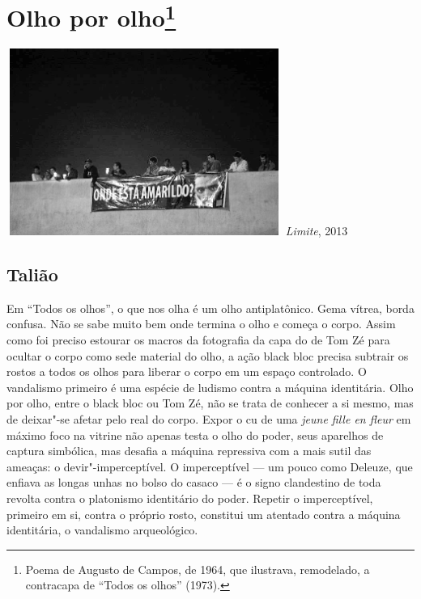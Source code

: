 \section*{Olho por olho\protect\footnote{Poema de Augusto de
  Campos, de 1964, que ilustrava, remodelado, a contracapa de ``Todos os
  olhos'' (1973).}}

\begin{center}
\includegraphics[width=9cm,height=6.1cm]{Imgs/img7.jpg}
\emph{Limite}, 2013
\end{center}

\subsection{Talião}

Em ``Todos os olhos'', o que nos olha é um olho
antiplatônico. Gema vítrea, borda confusa. Não se sabe muito bem onde
termina o olho e começa o corpo. Assim como foi preciso estourar os
macros da fotografia da capa do  de Tom Zé para ocultar o corpo como
sede material do olho, a ação black bloc precisa subtrair os rostos a
todos os olhos para liberar o corpo em um espaço controlado. O
vandalismo primeiro é uma espécie de ludismo contra a máquina
identitária. Olho por olho, entre o black bloc ou Tom Zé, não se trata
de conhecer a si mesmo, mas de deixar"-se afetar pelo real do corpo.
Expor o cu de uma \emph{jeune fille en fleur} em máximo foco na
vitrine não apenas testa o olho do poder, seus aparelhos de captura
simbólica, mas desafia a máquina repressiva com a mais sutil das
ameaças: o devir"-imperceptível. O imperceptível --- um pouco como
Deleuze, que enfiava as longas unhas no bolso do casaco --- é o signo
clandestino de toda revolta contra o platonismo identitário do poder.
Repetir o imperceptível, primeiro em si, contra o próprio rosto,
constitui um atentado contra a máquina identitária, o vandalismo
arqueológico.

